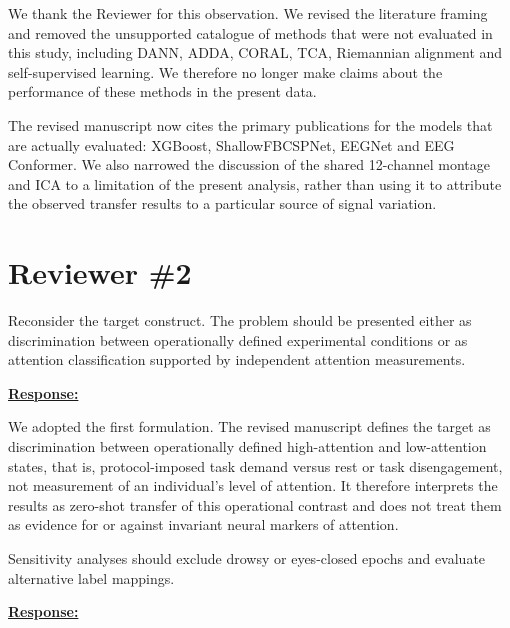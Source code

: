 \documentclass{article}
\begin{document}
We thank the Reviewer for this observation. We revised the literature framing
and removed the unsupported catalogue of methods that were not evaluated in
this study, including DANN, ADDA, CORAL, TCA, Riemannian alignment and
self-supervised learning. We therefore no longer make claims about the
performance of these methods in the present data.

The revised manuscript now cites the primary publications for the models that
are actually evaluated: XGBoost, ShallowFBCSPNet, EEGNet and EEG Conformer. We
also narrowed the discussion of the shared 12-channel montage and ICA to a
limitation of the present analysis, rather than using it to attribute the
observed transfer results to a particular source of signal variation.

\vspace{0.3cm}


\newpage
\setcounter{tcb@cnt@cmt}{0}
\section*{Reviewer \#2}

\vspace{0.4cm}

\begin{cmt}{}{}

Reconsider the target construct. The problem should be presented either as
discrimination between operationally defined experimental conditions or as
attention classification supported by independent attention measurements.

\end{cmt}
\vspace{0.1cm}
\noindent
\underline{\textbf{Response:}}
\vspace{0.2cm}

We adopted the first formulation. The revised manuscript defines the target as
discrimination between operationally defined high-attention and low-attention
states, that is, protocol-imposed task demand versus rest or task
disengagement, not measurement of an individual's level of attention. It therefore
interprets the results as zero-shot transfer of this operational contrast and
does not treat them as evidence for or against invariant neural markers of
attention.

\vspace{0.3cm}


\begin{cmt}{}{}

Sensitivity analyses should exclude drowsy or eyes-closed epochs and evaluate
alternative label mappings.

\end{cmt}
\vspace{0.1cm}
\noindent
\underline{\textbf{Response:}}
\vspace{0.2cm}
\end{document}
